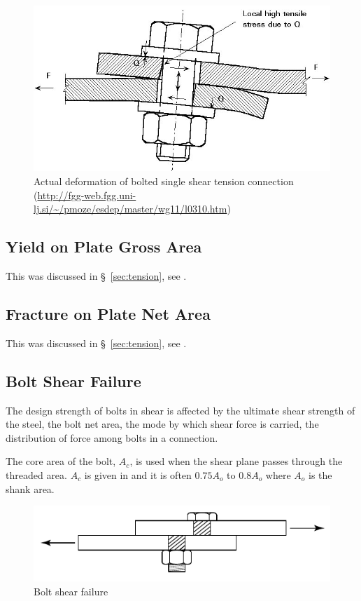 \begin{figure}[H]
\centering
\includegraphics[scale=.5]{PIC/CH06/BD}
\caption{Actual deformation of bolted single shear tension connection (\href{http://fgg-web.fgg.uni-lj.si/~/pmoze/esdep/master/wg11/l0310.htm}{\url{http://fgg-web.fgg.uni-lj.si/~/pmoze/esdep/master/wg11/l0310.htm}})}
\end{figure}
\subsection{Yield on Plate Gross Area}
This was discussed in \S~\ref{sec:tension}, see .
\subsection{Fracture on Plate Net Area}
This was discussed in \S~\ref{sec:tension}, see .
\subsection{Bolt Shear Failure}
The design strength of bolts in shear is affected by the ultimate shear strength of the steel, the bolt net area, the mode by which shear force is carried, the distribution of force among bolts in a connection.

The core area of the bolt, $A_c$, is used when the shear plane passes through the threaded area. $A_c$ is given in  and it is often $0.75A_o$ to $0.8A_o$ where $A_o$ is the shank area.
\begin{figure}[H]
\centering
\includegraphics[scale=1.2]{PIC/CH06/BSF}\caption{Bolt shear failure}
\end{figure}


